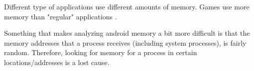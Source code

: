 Different type of applications use different amounts of memory. Games use more memory than "regular" applications \cite{}.

Something that makes analyzing android memory a bit more difficult is that the memory addresses that a process
receives (including system processes), is fairly random. Therefore, looking for memory for a process in certain
locations/addresses is a lost cause. %



%
%

